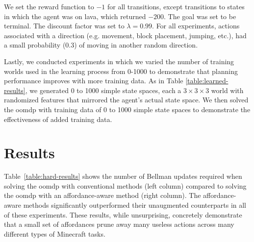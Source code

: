 \documentclass[letterpaper]{article}
\begin{document}
We set the reward function to $-1$ for all transitions, except
transitions to states in which the agent was on lava, which returned 
$-200$. The goal was set to be terminal. The discount
factor was set to $\lambda = 0.99$. For all experiments, actions associated with
a direction (e.g. movement, block placement, jumping, etc.), had a small 
probability ($0.3$) of moving in another random direction.

Lastly, we conducted experiments in which we varied the number of training worlds
used in the learning process from 0-1000 to demonstrate that planning
performance improves with more training data. As in Table \ref{table:learned-results}, we generated 0 to 1000 simple state
spaces, each a $3\times3\times3$ world with randomized features that mirrored the agent's actual state space. We then solved
the \gls{oomdp} with training data of 0 to 1000 simple state spaces to demonstrate the effectiveness of added training data.

\section{Results}
\label{sec:results}

Table~\ref{table:hard-results} shows the number of Bellman updates required when solving the \gls{oomdp} with conventional methods (left column)
compared to solving the \gls{oomdp} with an affordance-aware method (right column).  The
affordance-aware methods significantly outperformed their unaugmented
counterparts in all of these experiments. These
results, while unsurprising, concretely demonstrate that a small set of affordances prune away many useless actions across many different types of Minecraft tasks. 
\end{document}
